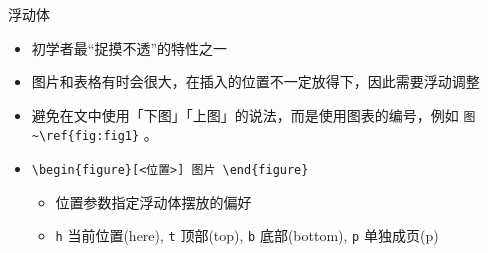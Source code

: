 \begin{frame}[fragile]{浮动体}
\begin{itemize}
\item 初学者最``捉摸不透''的特性之一
\item 图片和表格有时会很大，在插入的位置不一定放得下，因此需要浮动调整
\item 避免在文中使用「下图」「上图」的说法，而是使用图表的编号，例如 \verb|图~\ref{fig:fig1}| 。
\item \verb|\begin{figure}[<位置>] 图片 \end{figure}|
\begin{itemize}
\item 位置参数指定浮动体摆放的偏好
\item \verb|h| 当前位置(here), \verb|t| 顶部(top), \verb|b| 底部(bottom), \verb|p| 单独成页(p)
\end{itemize}
\end{itemize}
\end{frame}


